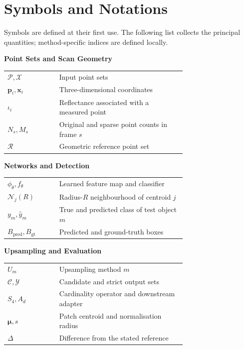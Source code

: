 \chapter{Symbols and Notations}
Symbols are defined at their first use. The following list collects the
principal quantities; method-specific indices are defined locally.

\begin{singlespace}
\noindent\textbf{Point Sets and Scan Geometry}\par\nobreak\vspace{0.4em}
\noindent\begin{tabular}{@{}lL{0.71\linewidth}@{}}
$\mathcal P,\mathcal X$ & Input point sets\\
$\mathbf p_i,\mathbf x_i$ & Three-dimensional coordinates\\
$\iota_i$ & Reflectance associated with a measured point\\
$N_s,M_s$ & Original and sparse point counts in frame $s$\\
$\mathcal R$ & Geometric reference point set\\
\end{tabular}\par\vspace{0.8em}
\noindent\textbf{Networks and Detection}\par\nobreak\vspace{0.4em}
\noindent\begin{tabular}{@{}lL{0.71\linewidth}@{}}
$\phi_\theta,f_\theta$ & Learned feature map and classifier\\
$\mathcal N_j(R)$ & Radius-$R$ neighbourhood of centroid $j$\\
$y_m,\hat y_m$ & True and predicted class of test object $m$\\
$B_{\mathrm{pred}},B_{\mathrm{gt}}$ & Predicted and ground-truth boxes\\
\end{tabular}\par\vspace{0.8em}
\noindent\textbf{Upsampling and Evaluation}\par\nobreak\vspace{0.4em}
\noindent\begin{tabular}{@{}lL{0.71\linewidth}@{}}
$U_m$ & Upsampling method $m$\\
$\mathcal C,\mathcal Y$ & Candidate and strict output sets\\
$S_4,A_d$ & Cardinality operator and downstream adapter\\
$\boldsymbol\mu,s$ & Patch centroid and normalisation radius\\
$\Delta$ & Difference from the stated reference\\
\end{tabular}\par\vspace{0.8em}
\end{singlespace}
